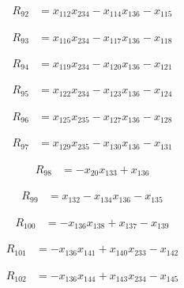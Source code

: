 \begin{align*}
R_{92} &= x_{112} x_{234} -x_{114} x_{136} -x_{115}
\end{align*}

\begin{align*}
R_{93} &= x_{116} x_{234} -x_{117} x_{136} -x_{118}
\end{align*}

\begin{align*}
R_{94} &= x_{119} x_{234} -x_{120} x_{136} -x_{121}
\end{align*}

\begin{align*}
R_{95} &= x_{122} x_{234} -x_{123} x_{136} -x_{124}
\end{align*}

\begin{align*}
R_{96} &= x_{125} x_{235} -x_{127} x_{136} -x_{128}
\end{align*}

\begin{align*}
R_{97} &= x_{129} x_{235} -x_{130} x_{136} -x_{131}
\end{align*}

\begin{align*}
R_{98} &= -x_{20} x_{133} +x_{136}
\end{align*}

\begin{align*}
R_{99} &= x_{132} -x_{134} x_{136} -x_{135}
\end{align*}

\begin{align*}
R_{100} &= -x_{136} x_{138} +x_{137} -x_{139}
\end{align*}

\begin{align*}
R_{101} &= -x_{136} x_{141} +x_{140} x_{233} -x_{142}
\end{align*}

\begin{align*}
R_{102} &= -x_{136} x_{144} +x_{143} x_{234} -x_{145}
\end{align*}

